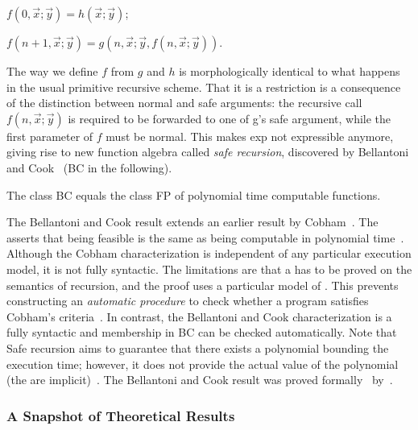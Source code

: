 \begin{center}
\(f (0, \vec{x};\vec{y}) = h (\vec{x};\vec{y})\);

\(f (n + 1,\vec{x};{ }\vec{y}) =
g (n, \vec{x}; \vec{y}, f(n,\vec{x}; \vec{y})) \).
\end{center}

\noindent The way we define \(f\) from \(g\) and \(h\) is
morphologically identical to what happens in the usual primitive recursive
scheme. That it is a restriction is a consequence of the distinction between
normal and safe arguments: the recursive call \(f(n,\vec{x};
\vec{y})\) is required to be forwarded to one of g's
safe argument, while the first parameter of \(f\) must be normal. This
makes exp not expressible anymore, giving rise to new function algebra called
\emph{safe recursion}, discovered by Bellantoni and
Cook~\cite{bellantoni1992} (BC in the following).

\begin{theorem}
The class BC equals the class FP of polynomial time computable functions.
\end{theorem}

The Bellantoni and Cook result extends an earlier result by
Cobham~\cite{cobham1965}. The  asserts that being
feasible is the same as being computable in polynomial
time~\cite{cobham1965,edmonds1965}. Although the Cobham characterization is
independent of any particular execution model, it is not fully syntactic. The
limitations are that a  has to be proved on the semantics of
recursion, and the proof uses a particular model of . This
prevents constructing an \emph{automatic procedure} to check whether a program
satisfies Cobham's criteria~\cite{heraud2011}. In contrast, the Bellantoni and
Cook characterization is a fully syntactic and membership in BC can be checked
automatically. Note that Safe recursion aims to guarantee that there exists a
polynomial bounding the execution time; however, it does not provide the actual
value of the polynomial (\ie the  are
implicit)~\textcite{heraud2011}. The Bellantoni and Cook result was proved
formally~\cite{bc_formal} by~\textcite{heraud2011}.

\subsubsection{A Snapshot of Theoretical Results}
\label{icc-theories}

